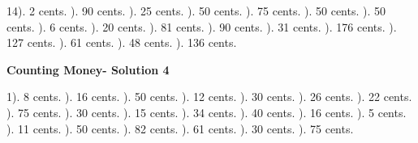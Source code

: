 \documentclass{article}%
\begin{document}
14). 2 cents.%
). 90 cents.%
). 25 cents.%
). 50 cents.%
). 75 cents.%
). 50 cents.%
). 50 cents.%
). 6 cents.%
). 20 cents.%
). 81 cents.%
). 90 cents.%
). 31 cents.%
). 176 cents.%
). 127 cents.%
). 61 cents.%
). 48 cents.%
). 136 cents.%
\newline%
\newpage%
\large%
\begin{center}%
\textbf{Counting Money- Solution 4}%
\newline%
\end{center} \normalsize%
1). 8 cents.%
). 16 cents.%
). 50 cents.%
). 12 cents.%
). 30 cents.%
). 26 cents.%
). 22 cents.%
). 75 cents.%
). 30 cents.%
). 15 cents.%
). 34 cents.%
). 40 cents.%
). 16 cents.%
). 5 cents.%
). 11 cents.%
). 50 cents.%
). 82 cents.%
). 61 cents.%
). 30 cents.%
). 75 cents.%
\end{document}
